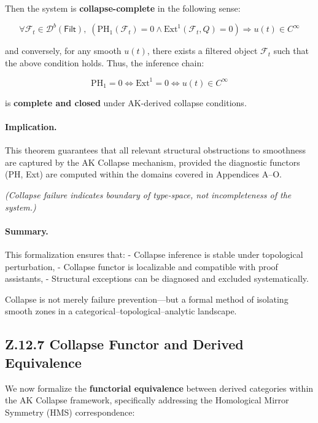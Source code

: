 \documentclass[11pt]{article}
\begin{document}
\begin{axiom}
\begin{axiom}
{{Then the system is \textbf{collapse-complete} in the following sense:

\[
\forall \mathcal{F}_t \in \mathcal{D}^b(\mathsf{Filt}),\;
\left( \mathrm{PH}_1(\mathcal{F}_t) = 0 \land \mathrm{Ext}^1(\mathcal{F}_t, Q) = 0 \right)
\Rightarrow u(t) \in C^\infty
\]

and conversely, for any smooth \( u(t) \), there exists a filtered object \( \mathcal{F}_t \) such that the above condition holds.  
Thus, the inference chain:

\[
\mathrm{PH}_1 = 0 \Leftrightarrow \mathrm{Ext}^1 = 0 \Leftrightarrow u(t) \in C^\infty
\]

is \textbf{complete and closed} under AK-derived collapse conditions.

\vspace{1em}
\paragraph{Implication.}

This theorem guarantees that all relevant structural obstructions to smoothness are captured by the AK Collapse mechanism,  
provided the diagnostic functors (PH, Ext) are computed within the domains covered in Appendices A–O.

\vspace{1em}
\textit{(Collapse failure indicates boundary of type-space, not incompleteness of the system.)}



\paragraph{Summary.}

This formalization ensures that:
- Collapse inference is stable under topological perturbation,
- Collapse functor is localizable and compatible with proof assistants,
- Structural exceptions can be diagnosed and excluded systematically.

Collapse is not merely failure prevention—but a formal method of isolating smooth zones in a categorical–topological–analytic landscape.


\subsection*{Z.12.7 Collapse Functor and Derived Equivalence}

We now formalize the \textbf{functorial equivalence} between derived categories within the AK Collapse framework,  
specifically addressing the Homological Mirror Symmetry (HMS) correspondence:

}}
\end{axiom}
\end{axiom}
\end{document}

